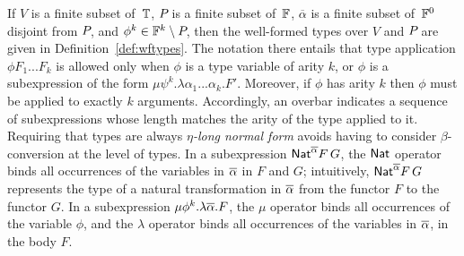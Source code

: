 \documentclass[runningheads]{llncs}
\begin{document}
If $V$ is a finite subset of\, $\mathbb{T}$, $P\!$ is a finite subset
of\, $\mathbb{F}$, $\overline{\alpha}$ is a finite subset of\, $\mathbb{F}^0$
disjoint from $P\!$, and $\phi^k \in \mathbb{F}^k \setminus P\!$, then
the well-formed types over $V$ and $P\!$ are given in
Definition~\ref{def:wftypes}.  The notation there entails that type
application $\phi F_1...F_k$ is allowed only when $\phi$ is a type
variable of arity $k$, or $\phi$ is a subexpression of the form $\mu
\psi^{k}.\lambda \alpha_1...\alpha_k.F'$. Moreover, if $\phi$ has
arity $k$ then $\phi$ must be applied to exactly $k$ arguments.
Accordingly, an overbar indicates a sequence of subexpressions whose
length matches the arity of the type applied to it. Requiring that
types are always \emph{$\eta$-long normal form} avoids having to
consider $\beta$-conversion at the level of types. In a subexpression
$\mathsf{Nat}^{\overline{\alpha}}F\,G$, the $\mathsf{Nat}$ operator binds all occurrences of
the variables in $\overline{\alpha}$ in $F$ and $G$; intuitively, $\mathsf{Nat}^{\overline{\alpha}}F\,G$ represents the type of a natural transformation in $\overline{\alpha}$ from the functor $F$ to the functor $G$. In a subexpression
  $\mu \phi^k.\lambda \overline{\alpha}.F$, the $\mu$ operator binds all
  occurrences of the variable $\phi$, and the $\lambda$ operator binds
  all occurrences of the variables in $\overline{\alpha}$, in the body $F$.
\end{document}
